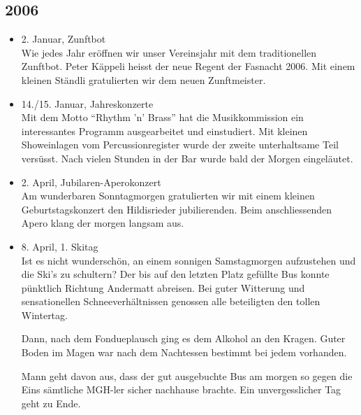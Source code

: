 \subsection*{2006}

\begin{history}


    \begin{itemize}

        \item 2. Januar, Zunftbot\\
              Wie jedes Jahr eröffnen wir unser Vereinsjahr mit dem traditionellen
              Zunftbot. Peter Käppeli heisst der neue Regent der Fasnacht 2006. Mit
              einem kleinen Ständli gratulierten wir dem neuen Zunftmeister.

        \item 14./15. Januar, Jahreskonzerte\\
              Mit dem Motto \enquote{Rhythm 'n’ Brass} hat die Musikkommission ein
              interessantes Programm ausgearbeitet und einstudiert. Mit kleinen
              Showeinlagen vom Percussionregister wurde der zweite unterhaltsame Teil
              versüsst. Nach vielen Stunden in der Bar wurde bald der Morgen
              eingeläutet.

        \item 2. April, Jubilaren-Aperokonzert\\
              Am wunderbaren Sonntagmorgen gratulierten wir mit einem kleinen
              Geburtstagskonzert den Hildisrieder jubilierenden. Beim anschliessenden
              Apero klang der morgen langsam aus.

        \item 8. April, 1. Skitag\\
              Ist es nicht wunderschön, an einem sonnigen Samstagmorgen aufzustehen
              und die Ski's zu schultern? Der bis auf den letzten Platz gefüllte Bus
              konnte pünktlich Richtung Andermatt abreisen. Bei guter Witterung und
              sensationellen Schneeverhältnissen genossen alle beteiligten den tollen
              Wintertag.

              Dann, nach dem Fondueplausch ging es dem Alkohol an den Kragen. Guter
              Boden im Magen war nach dem Nachtessen bestimmt bei jedem vorhanden.

              Mann geht davon aus, dass der gut ausgebuchte Bus am morgen so gegen die
              Eins sämtliche MGH-ler sicher nachhause brachte. Ein unvergesslicher Tag
              geht zu Ende.


\end{itemize}
\end{history}
